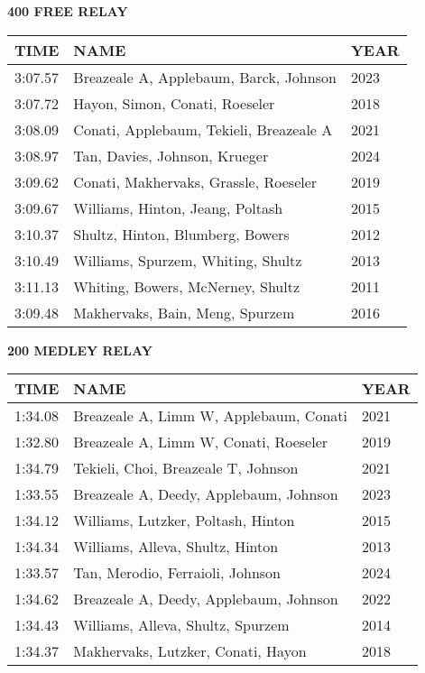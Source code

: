 \begin{table}[H]
\centering
\begin{minipage}[t]{0.6\textwidth}
\centering
\textbf{400 FREE RELAY}\\[0.1cm]
\begin{tabular}{@{}p{1.8cm}p{2.8cm}p{1.2cm}@{}}
\hline
    \textbf{TIME} & \textbf{NAME} & \textbf{YEAR} \\
\hline
    3:07.57 & Breazeale A, Applebaum, Barck, Johnson & 2023 \\
    3:07.72 & Hayon, Simon, Conati, Roeseler & 2018 \\
    3:08.09 & Conati, Applebaum, Tekieli, Breazeale A & 2021 \\
    3:08.97 & Tan, Davies, Johnson, Krueger & 2024 \\
    3:09.62 & Conati, Makhervaks, Grassle, Roeseler & 2019 \\
    3:09.67 & Williams, Hinton, Jeang, Poltash & 2015 \\
    3:10.37 & Shultz, Hinton, Blumberg, Bowers & 2012 \\
    3:10.49 & Williams, Spurzem, Whiting, Shultz & 2013 \\
    3:11.13 & Whiting, Bowers, McNerney, Shultz & 2011 \\
    3:09.48 & Makhervaks, Bain, Meng, Spurzem & 2016 \\
\hline
\end{tabular}
\end{minipage}
\end{table}

\begin{table}[H]
\centering
\begin{minipage}[t]{0.6\textwidth}
\centering
\textbf{200 MEDLEY RELAY}\\[0.1cm]
\begin{tabular}{@{}p{1.8cm}p{2.8cm}p{1.2cm}@{}}
\hline
    \textbf{TIME} & \textbf{NAME} & \textbf{YEAR} \\
\hline
    1:34.08 & Breazeale A, Limm W, Applebaum, Conati & 2021 \\
    1:32.80 & Breazeale A, Limm W, Conati, Roeseler & 2019 \\
    1:34.79 & Tekieli, Choi, Breazeale T, Johnson & 2021 \\
    1:33.55 & Breazeale A, Deedy, Applebaum, Johnson & 2023 \\
    1:34.12 & Williams, Lutzker, Poltash, Hinton & 2015 \\
    1:34.34 & Williams, Alleva, Shultz, Hinton & 2013 \\
    1:33.57 & Tan, Merodio, Ferraioli, Johnson & 2024 \\
    1:34.62 & Breazeale A, Deedy, Applebaum, Johnson & 2022 \\
    1:34.43 & Williams, Alleva, Shultz, Spurzem & 2014 \\
    1:34.37 & Makhervaks, Lutzker, Conati, Hayon & 2018 \\
\hline
\end{tabular}
\end{minipage}
\end{table}

